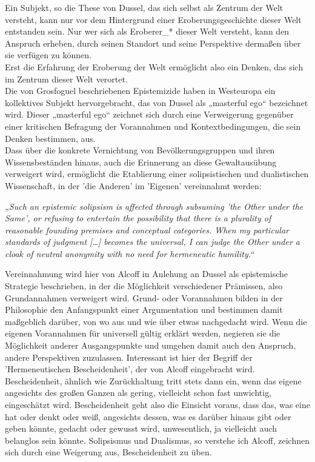 Ein Subjekt, so die These von Dussel, das sich selbst als Zentrum der Welt
versteht, kann nur vor dem Hintergrund einer Eroberungsgeschichte dieser Welt
entstanden sein. Nur wer sich als Eroberer\_* dieser Welt versteht, kann den
Anspruch erheben, durch seinen Standort und seine Perspektive dermaßen über sie
verfügen zu können.\\
Erst die Erfahrung der Eroberung der Welt ermöglicht also
ein Denken, das sich im Zentrum dieser Welt verortet. \\
Die von Grosfoguel
beschriebenen Epistemizide haben in Westeuropa ein kollektives Subjekt
hervorgebracht, das von Dussel als „masterful ego“ \footnotemark
{} bezeichnet wird. Dieser
„masterful ego“ zeichnet sich durch eine Verweigerung gegenüber einer
kritischen Befragung der Vorannahmen und Kontextbedingungen, die sein Denken
bestimmen, aus.\\
Dass über die konkrete Vernichtung von Bevölkerungsgruppen und
ihren Wissensbeständen hinaus, auch die Erinnerung an diese Gewaltausübung
verweigert wird, ermöglicht die Etablierung einer solipsistischen und
dualistischen Wissenschaft, in der 'die Anderen' im 'Eigenen' vereinnahmt
werden:
\begin{myenv} 
  \textit{„Such an epistemic solipsism is affected through
    subsuming  'the Other under the Same', or refusing to entertain the
    possibility that there is a plurality of reasonable founding premises and
    conceptual categories. When my particular standards of judgment […] becomes
    the universal, I can judge the Other under a cloak of neutral anonymity
    with no need for hermeneutic humility.“ \footnotemark {} }
\end{myenv}
Vereinnahmung wird hier von Alcoff in Anlehung an Dussel als epistemische Strategie beschrieben,
in der die Möglichkeit verschiedener Prämissen, also Grundannahmen verweigert
wird. Grund- oder Vorannahmen bilden in der Philosophie den Anfangspunkt einer
Argumentation und bestimmen damit maßgeblich darüber, von wo aus und wie über
etwas nachgedacht wird. Wenn die eigenen Vorannahmen für universell gültig
erklärt werden, negieren sie die Möglichkeit anderer Ausgangspunkte und umgehen
damit auch den Anspruch, andere Perspektiven zuzulassen. Interessant ist hier
der Begriff der 'Hermeneutischen Bescheidenheit', der von Alcoff
eingebracht wird. \\
Bescheidenheit, ähnlich wie Zurückhaltung tritt stets dann
ein, wenn das eigene angesichts des großen Ganzen als gering, vielleicht schon
fast unwichtig, eingeschätzt wird. Bescheidenheit geht also die Einsicht
voraus, dass das, was eine hat oder denkt oder weiß, angesichts dessen, was es
darüber hinaus gibt oder geben könnte, gedacht oder gewusst wird, unwesentlich,
ja vielleicht auch belanglos sein könnte. Solipsismus und Dualismus, so
verstehe ich Alcoff, zeichnen sich durch eine Weigerung aus, Bescheidenheit
zu üben.\\

